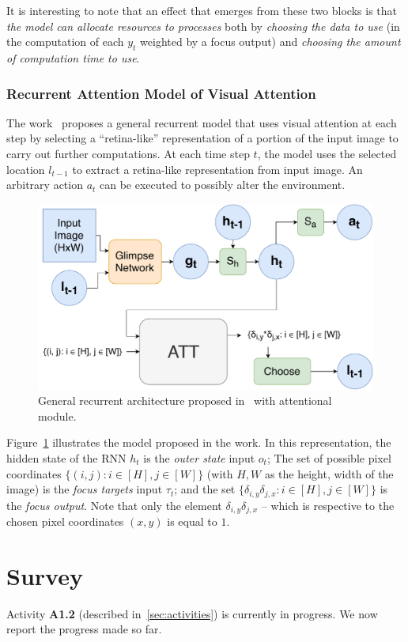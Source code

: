 \documentclass[12pt]{article}
\begin{document}
It is interesting to note that an effect that emerges from these two blocks is that
\emph{the model can allocate resources to processes} both by
\emph{choosing the data to use} (in the computation of each $y_t$ weighted by a focus output)
and \emph{choosing the amount of computation time to use}.

\subsubsection{Recurrent Attention Model of Visual Attention}
The work~\cite{ref:rec-models} proposes a general recurrent model that uses visual attention at each step
by selecting a ``retina-like'' representation of a portion of the input image to carry out further computations.
At each time step $t$, the model uses the selected location $l_{t-1}$ to extract a retina-like representation
from input image.
An arbitrary action $a_t$ can be executed to possibly alter the environment.

\begin{figure}[H]
    \centering
    \includegraphics[width=0.6\linewidth]{./img/ram.pdf}
    \caption{General recurrent architecture proposed in~\cite{ref:ram} with attentional module.}
\label{fig:ram}
\end{figure}

Figure~\ref{fig:ram} illustrates the model proposed in the work.
In this representation, the hidden state of the RNN $h_t$ is the \emph{outer state} input $o_t$;
The set of possible pixel coordinates $\{(i, j): i \in [H], j \in [W]\}$ (with $H, W$ as the height, width of the image)
is the \emph{focus targets} input $\tau_t$;
and the set $\{\delta_{i, y}\delta_{j, x}: i \in [H], j \in [W]\}$ is the \emph{focus output}.
Note that only the element $\delta_{i, y}\delta_{j,x}$ -- which is respective to the chosen pixel coordinates $(x, y)$
is equal to $1$.

\section{Survey}
Activity \textbf{A1.2} (described in~\ref{sec:activities}) is currently in progress.
We now report the progress made so far.
\end{document}
